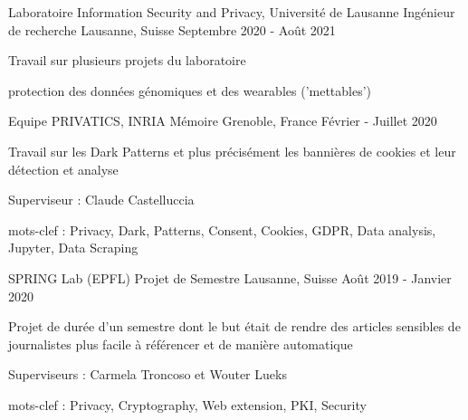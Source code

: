 


\begin{cventries}
	
\cventry
{Laboratoire Information Security and Privacy, Université de Lausanne} %
{Ingénieur de recherche} %
{Lausanne, Suisse} %
{Septembre 2020 - Août 2021} %
{ %
	\begin{cvitems}
		\item {Travail sur plusieurs projets du laboratoire}
		\item {protection des données génomiques et des wearables ('mettables')}
	\end{cvitems}
}
	
\cventry
{Equipe PRIVATICS, INRIA} %
{Mémoire} %
{Grenoble, France} %
{Février - Juillet 2020} %
{ %
	\begin{cvitems}
		\item {Travail sur les Dark Patterns et plus précisément les bannières de cookies et leur détection et analyse}
		\item {Superviseur : Claude Castelluccia}
		\item {mots-clef : Privacy, Dark, Patterns, Consent, Cookies, GDPR, Data analysis, Jupyter, Data Scraping}
	\end{cvitems}
}

\cventry
{SPRING Lab (EPFL)} %
{Projet de Semestre} %
{Lausanne, Suisse} %
{Août 2019 - Janvier 2020} %
{ %
	\begin{cvitems}
		\item {Projet de durée d'un semestre dont le but était de rendre des articles sensibles de journalistes plus facile à référencer et de manière automatique}
		\item {Superviseurs : Carmela Troncoso et Wouter Lueks}
		\item {mots-clef : Privacy, Cryptography, Web extension, PKI, Security}
	\end{cvitems}
}


\end{cventries}
